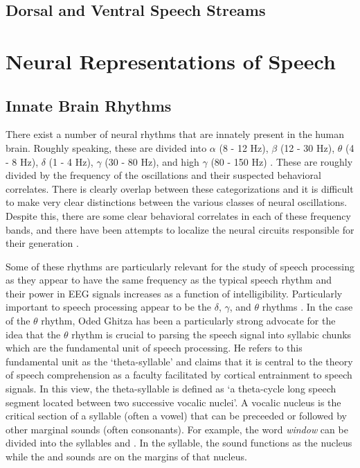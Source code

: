 \documentclass[titlepage]{article}
\begin{document}
  \subsection{Dorsal and Ventral Speech Streams}

\section{Neural Representations of Speech} \label{higher}

  \subsection{Innate Brain Rhythms} \label{innateBrainRhythms}

    There exist a number of neural rhythms that are innately present in the human brain. Roughly
    speaking, these are divided into $\alpha$ (8 - 12 Hz), $\beta$ (12 - 30 Hz),
    $\theta$ (4 - 8 Hz), $\delta$ (1 - 4 Hz),
    $\gamma$ (30 - 80 Hz), and high $\gamma$ (80 - 150 Hz) \cite{Muresan2008,Rangaswamy2002}. These are roughly divided by
    the frequency of the oscillations and their suspected behavioral correlates. There is clearly
    overlap between these categorizations and it is difficult to make very clear distinctions between
    the various classes of neural oscillations. Despite this, there are some clear behavioral correlates
    in each of these frequency bands, and there have been attempts to localize the neural circuits
    responsible for their generation \cite{Michel1992}.

    Some of these rhythms are particularly relevant for the study of speech processing as they appear
    to have the same frequency as the typical speech rhythm and their power in EEG signals increases
    as a function of intelligibility. Particularly important to speech processing appear to be
    the $\delta$, $\gamma$, and $\theta$ rhythms \cite{Ghitza2009,Meyer2018}. In the case of the
    $\theta$ rhythm, Oded Ghitza has been a particularly strong advocate for the idea that the
    $\theta$ rhythm is crucial to parsing the speech signal into syllabic chunks which are the
    fundamental unit of speech processing. He refers to this fundamental unit as the `theta-syllable'
    \cite{Ghitza2013a} and claims that it is central to the theory of speech comprehension as a
    faculty facilitated by cortical entrainment to speech signals. In this view, the theta-syllable
    is defined as `a theta-cycle long speech segment located between two successive vocalic nuclei'.
    A vocalic nucleus is the critical section of a syllable (often a vowel) that can be preceeded
    or followed by other marginal sounds (often consonants). For example, the word \textit{window}
    can be divided into the syllables  and . In the 
    syllable, the  sound functions as the nucleus while the  and 
    sounds are on the margins of that nucleus.
\end{document}
